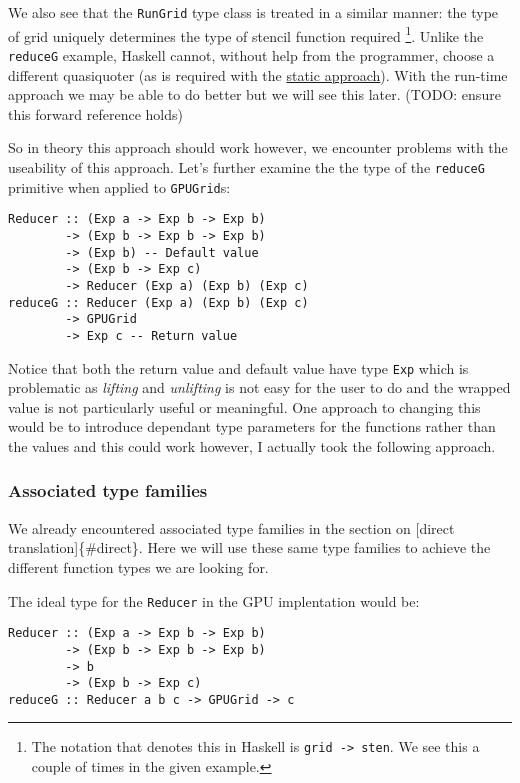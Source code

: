 We also see that the \texttt{RunGrid} type class is treated in a similar
manner: the type of grid uniquely determines the type of stencil
function required \footnote{The notation that denotes this in Haskell is
  \texttt{grid -\textgreater{} sten}. We see this a couple of times in
  the given example.}. Unlike the \texttt{reduceG} example, Haskell
cannot, without help from the programmer, choose a different quasiquoter
(as is required with the \hyperref[type-sys]{static approach}). With the
run-time approach we may be able to do better but we will see this
later. (TODO: ensure this forward reference holds)

So in theory this approach should work however, we encounter problems
with the useability of this approach. Let's further examine the the type
of the \texttt{reduceG} primitive when applied to \texttt{GPUGrid}s:

\begin{verbatim}
Reducer :: (Exp a -> Exp b -> Exp b)
        -> (Exp b -> Exp b -> Exp b)
        -> (Exp b) -- Default value
        -> (Exp b -> Exp c)
        -> Reducer (Exp a) (Exp b) (Exp c)
reduceG :: Reducer (Exp a) (Exp b) (Exp c)
        -> GPUGrid
        -> Exp c -- Return value
\end{verbatim}

Notice that both the return value and default value have type
\texttt{Exp} which is problematic as \emph{lifting} and \emph{unlifting}
is not easy for the user to do and the wrapped value is not particularly
useful or meaningful. One approach to changing this would be to
introduce dependant type parameters for the functions rather than the
values and this could work however, I actually took the following
approach.

\subsubsection{Associated type families}

We already encountered associated type families in the section on
{[}direct translation{]}\{\#direct\}. Here we will use these same type
families to achieve the different function types we are looking for.

The ideal type for the \texttt{Reducer} in the GPU implentation would
be:

\begin{verbatim}
Reducer :: (Exp a -> Exp b -> Exp b)
        -> (Exp b -> Exp b -> Exp b)
        -> b
        -> (Exp b -> Exp c)
reduceG :: Reducer a b c -> GPUGrid -> c
\end{verbatim}


